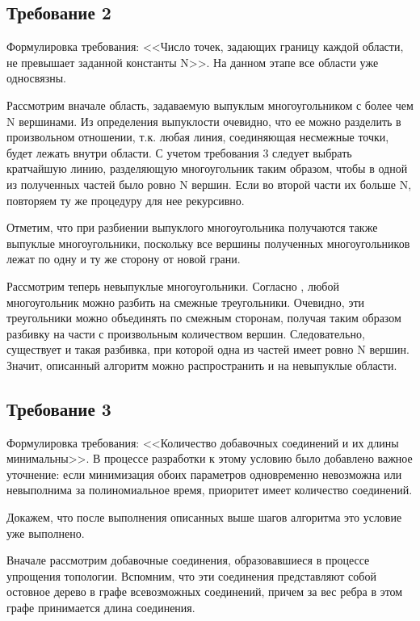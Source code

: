 \subsection{Требование 2}
\label{}

Формулировка требования: <<Число точек, задающих границу каждой области, не превышает заданной константы N>>. На данном этапе все области уже односвязны.

Рассмотрим вначале область, задаваемую выпуклым многоугольником с более чем N вершинами. Из определения выпуклости очевидно, что ее можно разделить в произвольном отношении, т.к. любая линия, соединяющая несмежные точки, будет лежать внутри области. С учетом требования 3 следует выбрать кратчайшую линию, разделяющую многоугольник таким образом, чтобы в одной из полученных частей было ровно N вершин. Если во второй части их больше N, повторяем ту же процедуру для нее рекурсивно.

Отметим, что при разбиении выпуклого многоугольника получаются также выпуклые многоугольники, поскольку все вершины полученных многоугольников лежат по одну и ту же сторону от новой грани.

Рассмотрим теперь невыпуклые многоугольники. Согласно \cite{de_berg_chapter_2000}, любой многоугольник можно разбить на смежные треугольники. Очевидно, эти треугольники можно объединять по смежным сторонам, получая таким образом разбивку на части с произвольным количеством вершин. Следовательно, существует и такая разбивка, при которой одна из частей имеет ровно N вершин. Значит, описанный алгоритм можно распространить и на невыпуклые области.

\subsection{Требование 3}
\label{}

Формулировка требования: <<Количество добавочных соединений и их длины минимальны>>. В процессе разработки к этому условию было добавлено важное уточнение: если минимизация обоих параметров одновременно невозможна или невыполнима за полиномиальное время, приоритет имеет количество соединений.

Докажем, что после выполнения описанных выше шагов алгоритма это условие уже выполнено.

Вначале рассмотрим добавочные соединения, образовавшиеся в процессе упрощения топологии. Вспомним, что эти соединения представляют собой остовное дерево в графе всевозможных соединений, причем за вес ребра в этом графе принимается длина соединения.

